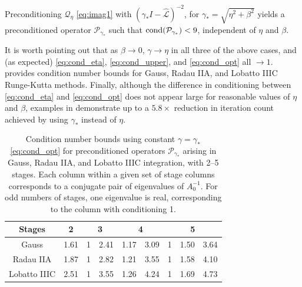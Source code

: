\documentclass[review]{siamart}
\begin{document}
%
\begin{corollary}\label{cor:independent}
\textnormal{ }
Preconditioning $\mathcal{Q}_\eta$ \eqref{eq:imag1} with
$(\gamma_* I - \widehat{\mathcal{L}})^{-2}$, for $\gamma_* = \sqrt{\eta^2+\beta^2}$
yields a preconditioned operator $\mathcal{P}_{\gamma_*}$ such that
$\textnormal{cond}(\mathcal{P}_{\gamma_*}) < 9$,
independent of $\eta$ and $\beta$.
\end{corollary}
%
It is worth pointing out that as $\beta \to 0$, $\gamma \to \eta$
in all three of the above cases, and (as expected) \eqref{eq:cond_eta},
\eqref{eq:cond_upper}, and \eqref{eq:cond_opt} all $\to 1$. 
provides condition number bounds for Gauss, Radau IIA, and Lobatto IIIC
Runge-Kutta methods.
Finally, although the difference in conditioning between \eqref{eq:cond_eta}
and \eqref{eq:cond_opt} does not appear large for reasonable values of
$\eta$ and $\beta$, examples in  demonstrate up to
a $5.8\times$ reduction in iteration count achieved by using $\gamma_*$
instead of $\eta$.

%
{
\renewcommand{\tabcolsep}{4pt}
\renewcommand{\arraystretch}{1.15}
\begin{table}[!ht]
  \centering
  \begin{tabular}{| c | c | cc | cc | ccc |}  %
  \hline
Stages & 2 & \multicolumn{2}{c}{3} & \multicolumn{2}{|c}{4} & \multicolumn{3}{|c|}{5} \\\hline\hline
Gauss & 1.61 & 1 & 2.41 & 1.17 & 3.09 & 1 & 1.50 & 3.64 \\
Radau IIA & 1.87 & 1 & 2.82 & 1.21 & 3.55 & 1 & 1.58 & 4.10 \\
Lobatto IIIC & 2.51 & 1 & 3.55 & 1.26 & 4.24 & 1 & 1.69 & 4.73  \\\hline
  \end{tabular}
  \caption{Condition number bounds using constant $\gamma=\gamma_*$ \eqref{eq:cond_opt}
  for preconditioned operators $\mathcal{P}_{\gamma_*}$ arising in Gauss, Radau IIA, and
  Lobatto IIIC integration, with 2--5 stages. Each column within a given set of stage columns corresponds to a conjugate pair of eigenvalues of $A_0^{-1}$. For odd numbers of stages,
  one eigenvalue is real, corresponding to the column with conditioning 1.}\label{tab:cond}
\end{table}
}
\end{document}
